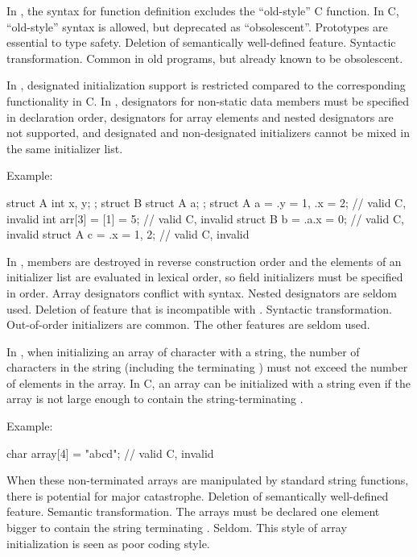 \change In \Cpp{}, the syntax for function definition excludes the ``old-style'' C function.
In C, ``old-style'' syntax is allowed, but deprecated as ``obsolescent''.
\rationale
Prototypes are essential to type safety.
\effect
Deletion of semantically well-defined feature.
\difficulty
Syntactic transformation.
\howwide
Common in old programs, but already known to be obsolescent.

\change
In \Cpp{}, designated initialization support is restricted
compared to the corresponding functionality in C\@.
In \Cpp{},
designators for non-static data members
must be specified in declaration order,
designators for array elements and nested designators
are not supported,
and
designated and non-designated initializers
cannot be mixed in the same initializer list.

Example:

\begin{codeblock}
struct A { int x, y; };
struct B { struct A a; };
struct A a = {.y = 1, .x = 2};  // valid C, invalid \Cpp{}
int arr[3] = {[1] = 5};         // valid C, invalid \Cpp{}
struct B b = {.a.x = 0};        // valid C, invalid \Cpp{}
struct A c = {.x = 1, 2};       // valid C, invalid \Cpp{}
\end{codeblock}
\rationale
In \Cpp{}, members are destroyed in reverse construction order
and the elements of an initializer list are evaluated in lexical order,
so field initializers must be specified in order.
Array designators conflict with  syntax.
Nested designators are seldom used.
\effect
Deletion of feature that is incompatible with \Cpp{}.
\difficulty
Syntactic transformation.
\howwide
Out-of-order initializers are common.
The other features are seldom used.

\change In \Cpp{}, when initializing an array of character with a string, the number of
characters in the string (including the terminating ) must not exceed the
number of elements in the array. In C, an array can be initialized with a string even if
the array is not large enough to contain the string-terminating .

Example:

\begin{codeblock}
char array[4] = "abcd";         // valid C, invalid \Cpp{}
\end{codeblock}
\rationale
When these non-terminated arrays are manipulated by standard
string functions, there is potential for major catastrophe.
\effect
Deletion of semantically well-defined feature.
\difficulty
Semantic transformation.
The arrays must be declared one element bigger to contain the
string terminating .
\howwide
Seldom.
This style of array initialization is seen as poor coding style.

